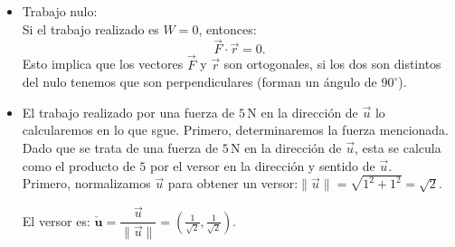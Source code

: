 \documentclass[11pt,a4paper]{article}
\begin{document}
\begin{enumerate}[\hspace{-5mm} 1) ]
\begin{itemize}

\medskip 

    Por lo tanto, el trabajo realizado es: \quad$ W = -1\,\text{J}$.
    

    \item[b)] Trabajo nulo: \\
    Si el trabajo realizado es $W = 0$, entonces:
    \[
    \vec{F} \cdot \vec{r} = 0.
    \]
    Esto implica que los vectores $\vec{F}$ y $\vec{r}$ son ortogonales, si los dos son distintos del nulo tenemos que son perpendiculares (forman un ángulo de $90^\circ$).


\bigskip 

    \item[c)] El trabajo realizado por una fuerza de $5\,\text{N}$ en la dirección de $\vec{u}$ lo calcularemos en lo que sgue. Primero, determinaremos la fuerza mencionada. Dado que se trata de una fuerza de $5\,\text{N}$ en la dirección de $\vec{u}$, esta se calcula como el producto de $5$ por el versor en la dirección y sentido de $\vec{u}$.  \\



    
    Primero, normalizamos $\vec{u}$ para obtener un versor:\quad $ \|\vec{u}\| = \sqrt{1^2 + 1^2} = \sqrt{2}.$ 

    
    El versor es: \qquad ${\bm{\check{u}}} = \dfrac{\vec{u}}{\|\vec{u}\|} = \left(\tfrac{1}{\sqrt{2}}, \tfrac{1}{\sqrt{2}}\right).$ 


\end{itemize}
\end{enumerate}
\end{document}

